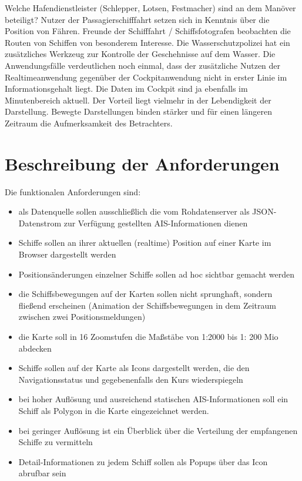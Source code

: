 Welche Hafendienstleister (Schlepper, Lotsen, Festmacher) sind an dem Manöver beteiligt?
Nutzer der Passagierschifffahrt setzen sich in Kenntnis über die Position von Fähren.
Freunde der Schifffahrt / Schiffsfotografen beobachten die Routen von Schiffen von besonderem Interesse.
Die Wasserschutzpolizei hat ein zusätzliches Werkzeug zur Kontrolle der Geschehnisse auf dem Wasser.
Die Anwendungsfälle verdeutlichen noch einmal, dass der zusätzliche Nutzen der Realtimeanwendung gegenüber der Cockpitanwendung nicht in erster Linie im Informationsgehalt liegt. Die Daten im Cockpit sind ja ebenfalls im Minutenbereich aktuell. Der Vorteil liegt vielmehr in der Lebendigkeit der Darstellung. Bewegte Darstellungen binden stärker und für einen längeren Zeitraum die Aufmerksamkeit des Betrachters.

\section{Beschreibung der Anforderungen}\label{s.Beschreibung der Anforderungen}

Die funktionalen Anforderungen sind:
\begin{itemize}

\item als Datenquelle sollen ausschließlich die vom Rohdatenserver als JSON-Datenstrom zur Verfügung gestellten AIS-Informationen dienen
\item Schiffe sollen an ihrer aktuellen (realtime) Position auf einer Karte im Browser dargestellt werden
\item Positionsänderungen einzelner Schiffe sollen ad hoc sichtbar gemacht werden
\item die Schiffsbewegungen auf der Karten sollen nicht sprunghaft, sondern fließend erscheinen (Animation der Schiffsbewegungen in dem Zeitraum zwischen zwei Positionsmeldungen)
\item die Karte soll in 16 Zoomstufen die Maßstäbe von 1:2000 bis 1: 200 Mio abdecken
\item Schiffe sollen auf der Karte als Icons dargestellt werden, die den Navigationsstatus und gegebenenfalls den Kurs wiederspiegeln
\item bei hoher Auflösung und ausreichend statischen AIS-Informationen soll ein Schiff als Polygon in die Karte eingezeichnet werden.
\item bei geringer Auflösung ist ein Überblick über die Verteilung der empfangenen Schiffe zu vermitteln
\item Detail-Informationen zu jedem Schiff sollen als Popups über das Icon abrufbar sein
\end{itemize}

